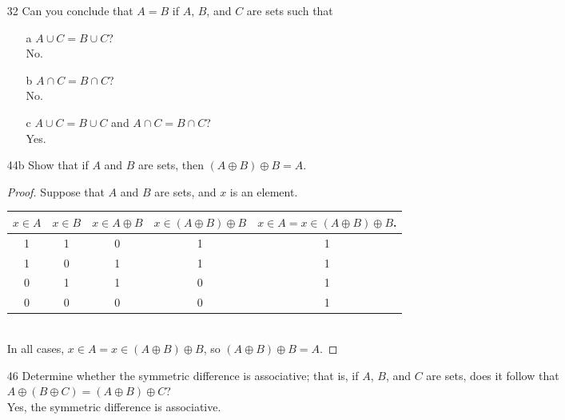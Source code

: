 \documentclass{article}
\begin{document}
\begin{itemize}
\begin{proof}
    \end{proof}
  \item[32] Can you conclude that $A=B$ if $A$, $B$, and $C$ are sets such that
    \begin{itemize}
      \item[a] $A \cup C = B \cup C$?\\
        No.
      \item[b] $A \cap C = B \cap C$?\\
        No.
      \item[c] $A \cup C = B \cup C$ and $A \cap C = B \cap C$?\\
        Yes.
    \end{itemize}
  \item[44b] Show that if $A$ and $B$ are sets, then $(A \oplus B) \oplus B = A$.
    \begin{proof}
      Suppose that $A$ and $B$ are sets, and $x$ is an element.

      \begin{tabular}{ c|c|c|c|c }
        $x \in A$ & $x \in B$ & $x \in A \oplus B$ & $x \in (A \oplus B) \oplus B$ &
        $x \in A = x \in (A \oplus B) \oplus B$.\\
        \hline
        1 & 1 & 0 & 1 & 1\\
        1 & 0 & 1 & 1 & 1\\
        0 & 1 & 1 & 0 & 1\\
        0 & 0 & 0 & 0 & 1\\
      \end{tabular}\\

      In all cases, $x \in A = x \in (A \oplus B) \oplus B$, so $(A \oplus B) \oplus B = A$.

    \end{proof}
  \item[46] Determine whether the symmetric difference is associative; that is,
    if $A$, $B$, and $C$ are sets, does it follow that
    $A \oplus (B \oplus C) = (A \oplus B) \oplus C$?\\
    Yes, the symmetric difference is associative.
\end{itemize}
\end{document}
